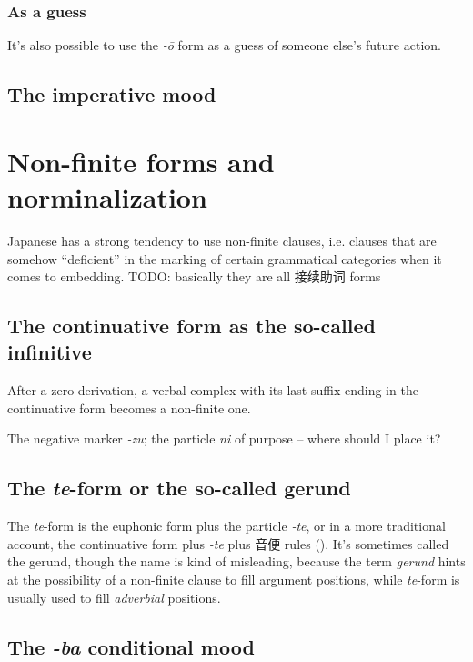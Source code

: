 \documentclass[UTF8, a4paper, oneside, scheme=plain]{ctexrep}
\newcommand*{\term}[1]{\emph{#1}}
\newcommand{\corpus}[1]{\emph{#1}}
\begin{document}
\subsubsection{As a guess}

It's also possible to use the \corpus{-\={o}} form as a guess of someone else's future action.

\subsection{The imperative mood}\label{sec:imperative}

\section{Non-finite forms and norminalization}\label{sec:non-finite}

Japanese has a strong tendency to use non-finite clauses,
i.e. clauses that are somehow ``deficient'' in the marking of certain grammatical categories 
when it comes to embedding.
TODO: basically they are all 接续助词 forms

\subsection{The continuative form as the so-called infinitive}

After a zero derivation, 
a verbal complex with its last suffix ending in the continuative form 
becomes a non-finite one.

The negative marker \corpus{-zu}; the particle \corpus{ni} of purpose -- where should I place it?

\subsection{The \corpus{te}-form or the so-called gerund}\label{sec:te-form}

The \corpus{te}-form is the euphonic form plus the particle \corpus{-te},
or in a more traditional account,
the continuative form plus \corpus{-te} plus 音便 rules ().
It's sometimes called the gerund,
though the name is kind of misleading,
because the term \term{gerund} hints at the possibility of a non-finite clause to fill argument positions,
while \corpus{te}-form is usually used to fill \emph{adverbial} positions.

\subsection{The \corpus{-ba} conditional mood} \label{sec:eba-form}
\end{document}
